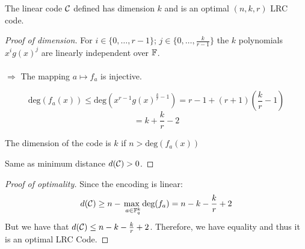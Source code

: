 \begin{frame}
    \begin{thm}
        The linear code $\mathcal{C}$ defined has dimension $k$ and is an optimal $(n,k,r)$ LRC code.
    \end{thm}
\end{frame}

\begin{frame}
    \begin{proof}[Proof of dimension]
        For $i \in \{0, \dots, r-1 \}$; $j \in \{0, \dots, \frac{k}{r-1}\}$ the $k$ polynomials $x^i g(x)^j$ are linearly independent over $\mathbb{F}$. \\~\\
        
        $\Rightarrow$ The mapping $a \mapsto f_a$ is injective.
        
        $$\mbox{deg}(f_a(x)) \leq \mbox{deg}(x^{r-1} g(x)^{\frac{k}{r}-1}) = r-1 + (r+1)(\frac{k}{r}-1)$$
        $$= k + \frac{k}{r} - 2$$
        
        The dimension of the code is $k$ if $n > \mbox{deg}(f_a(x))$
        
        Same as minimum distance $d(\mathcal{C})>0$.
    \end{proof}
\end{frame}

\begin{frame}
    \begin{proof}[Proof of optimality]
        Since the encoding is linear:
        $$d(\mathcal{C}) \geq n - \max_{\ a\in \mathbb{F}_q^k} \mbox{deg}(f_a) = n - k - \frac{k}{r} + 2 $$
        But we have that $d(\mathcal{C}) \leq n - k - \frac{k}{r} + 2$.
        Therefore, we have equality and thus it is an optimal LRC Code.
    \end{proof}
\end{frame}